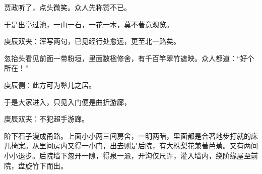 \begin{parag}
    贾政听了，点头微笑。众人先称赞不已。
\end{parag}


\begin{parag}
    于是出亭过池，一山一石，一花一木，莫不著意观览。\begin{note}庚辰双夹：浑写两句，已见经行处愈远，更至北一路矣。\end{note}忽抬头看见前面一带粉垣，里面数楹修舍，有千百竿翠竹遮映。众人都道：“好个所在！”\begin{note}庚辰侧：此方可为颦儿之居。\end{note}于是大家进入，只见入门便是曲折游廊，\begin{note}庚辰双夹：不犯超手游廊。\end{note}阶下石子漫成甬路。上面小小两三间房舍，一明两暗，里面都是合著地步打就的床几椅案。从里间房内又得一小门，出去则是后院，有大株梨花兼著芭蕉。又有两间小小退步。后院墙下忽开一隙，得泉一派，开沟仅尺许，灌入墙内，绕阶缘屋至前院，盘旋竹下而出。
\end{parag}



